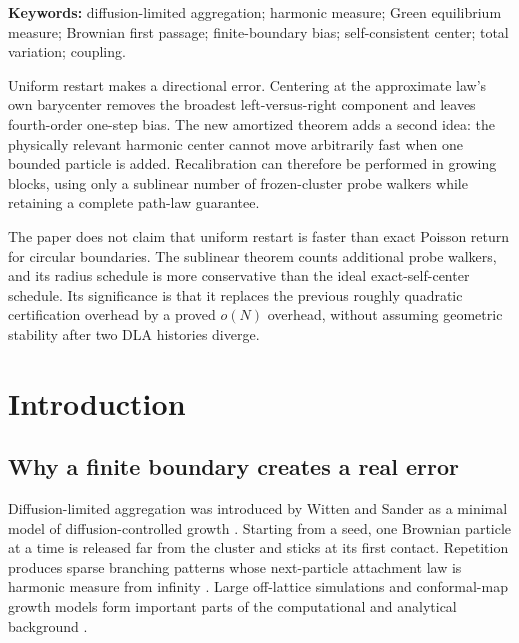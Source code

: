 \documentclass[11pt]{article}
\theoremstyle{mainthm}
\theoremstyle{definition}
\theoremstyle{remark}
\begin{document}
\begin{center}
\small\textbf{Keywords:} diffusion-limited aggregation; harmonic measure; Green equilibrium measure; Brownian first passage; finite-boundary bias; self-consistent center; total variation; coupling.
\end{center}

\begin{resultbox}
Uniform restart makes a directional error. Centering at the approximate law's own barycenter removes the broadest left-versus-right component and leaves fourth-order one-step bias. The new amortized theorem adds a second idea: the physically relevant harmonic center cannot move arbitrarily fast when one bounded particle is added. Recalibration can therefore be performed in growing blocks, using only a sublinear number of frozen-cluster probe walkers while retaining a complete path-law guarantee.
\end{resultbox}

\begin{cautionbox}
The paper does not claim that uniform restart is faster than exact Poisson return for circular boundaries. The sublinear theorem counts additional probe walkers, and its radius schedule is more conservative than the ideal exact-self-center schedule. Its significance is that it replaces the previous roughly quadratic certification overhead by a proved $o(N)$ overhead, without assuming geometric stability after two DLA histories diverge.
\end{cautionbox}

\tableofcontents
\newpage

\section{Introduction}

\subsection{Why a finite boundary creates a real error}

Diffusion-limited aggregation was introduced by Witten and Sander as a minimal model of diffusion-controlled growth \cite{WittenSander1981,WittenSander1983}. Starting from a seed, one Brownian particle at a time is released far from the cluster and sticks at its first contact. Repetition produces sparse branching patterns whose next-particle attachment law is harmonic measure from infinity \cite{Sander2000,Meakin1998,GarnettMarshall2005}. Large off-lattice simulations and conformal-map growth models form important parts of the computational and analytical background \cite{TolmanMeakin1989,HastingsLevitov1998,DavidovitchEtAl1999}.
\end{document}
